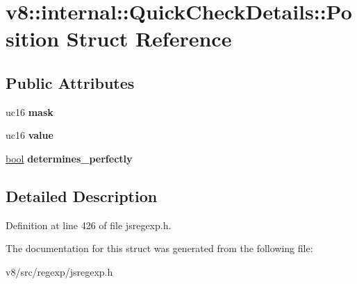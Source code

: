 \hypertarget{structv8_1_1internal_1_1QuickCheckDetails_1_1Position}{}\section{v8\+:\+:internal\+:\+:Quick\+Check\+Details\+:\+:Position Struct Reference}
\label{structv8_1_1internal_1_1QuickCheckDetails_1_1Position}
\subsection*{Public Attributes}
\begin{DoxyCompactItemize}
\item 
\mbox{\label{structv8_1_1internal_1_1QuickCheckDetails_1_1Position_aeb884849a8690bba0d4e9175d10af742}} 
uc16 {\bfseries mask}
\item 
\mbox{\label{structv8_1_1internal_1_1QuickCheckDetails_1_1Position_af6100b18395071db66ec6c33f51e52d9}} 
uc16 {\bfseries value}
\item 
\mbox{\label{structv8_1_1internal_1_1QuickCheckDetails_1_1Position_ad2a5c9be399371a2ebbbd56b483f2fd9}} 
\mbox{\hyperlink{classbool}{bool}} {\bfseries determines\+\_\+perfectly}
\end{DoxyCompactItemize}


\subsection{Detailed Description}


Definition at line 426 of file jsregexp.\+h.



The documentation for this struct was generated from the following file\+:\begin{DoxyCompactItemize}
\item 
v8/src/regexp/jsregexp.\+h\end{DoxyCompactItemize}
